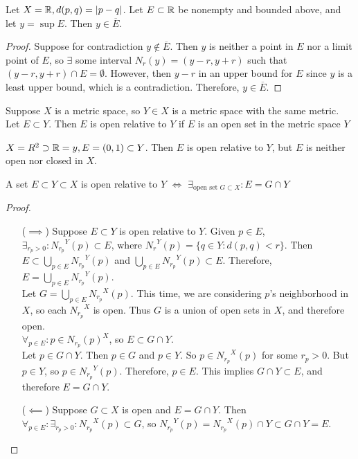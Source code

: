 \begin{example}
	Let $X=\mathbb{R} , d(p,q)=|p-q|$. Let $E \subset \mathbb{R} $ be nonempty and bounded above, and let $y=\sup E$. Then $y \in \overline{E}$.
	\begin{proof}
		Suppose for contradiction $y \not\in \overline{E}$. Then $y$ is neither a point in $E$ nor a limit point of $E$, so $\exists$ some interval $N_r(y)=(y-r,y+r)$ such that $(y-r,y+r) \cap  E=\emptyset $. However, then $y-r$ in an upper bound for $E$ since $y$ is a least upper bound, which is a contradiction. Therefore, $y \in \overline{E}$.
	\end{proof}
\end{example}

\begin{definition}
	Suppose $X$ is a metric space, so $Y \in X$ is a metric space with the same metric. Let $E \subset Y$. Then $E$ is open relative to $Y$ if $E$ is an open set in the metric space $Y$
\end{definition}

\begin{example}
	$X=R^2 \supset \mathbb{R} =y, E=(0,1) \subset Y$. Then $E$ is open relative to $Y$, but $E$ is neither open nor closed in $X$.
\end{example}

\begin{thm}[30]
	A set $E \subset Y \subset X$ is open relative to $Y$ $\Leftrightarrow $ $\exists_{\text{open set }G \subset  X}: E=G \cap Y$
	\begin{proof}
		\begin{itemize}
			\item[($\implies$)] Suppose $E \subset Y$ is open relative to $Y$. Given $p \in E$, $\exists_{r_p>0}: {N_{r_p}}^{Y}(p) \subset E$, where ${N_r}^{Y}(p)=\{q \in Y: d(p,q)<r\}$.
			      Then $E \subset \bigcup_{p \in E} {N_{r_p}}^{Y}(p)$ and $\bigcup_{p \in E} {N_{r_p}}^{Y}(p) \subset E$.
			      Therefore, $E= \bigcup_{p \in E} {N_{r_p}}^{Y}(p)$.\\
			      Let $G= \bigcup_{p \in E}{N_{r_p}}^{X}(p)$.
			      This time, we are considering $p$'s neighborhood in $X$, so each ${N_{r_p}}^{X}$ is open.
			      Thus $G$ is a union of open sets in $X$, and therefore open.\\
			      $\forall_{p \in E}: p \in {N_{r_p}(p)}^{X}$, so $E \subset G \cap Y$.\\
			      Let $p \in G \cap Y$. Then $p \in G$ and $p \in Y$. So $p \in {N_{r_p}}^{X}(p)$ for some $r_p>0$. But $p \in Y$, so $p \in {N_{r_p}}^{Y}(p)$. Therefore, $p \in E$. This implies $G \cap Y \subset E$, and therefore $E=G \cap Y$.
			\item [($\impliedby$)]
			      Suppose $G \subset X$ is open and $E= G \cap Y$.
			      Then $\forall_{p \in E}: \exists_{r_p>0}: {N_{r_p}}^{X}(p) \subset G $, so ${N_{r_p}}^{Y}(p)={N_{r_p}}^{X}(p) \cap Y \subset G \cap Y=E$.
		\end{itemize}
	\end{proof}
\end{thm}

